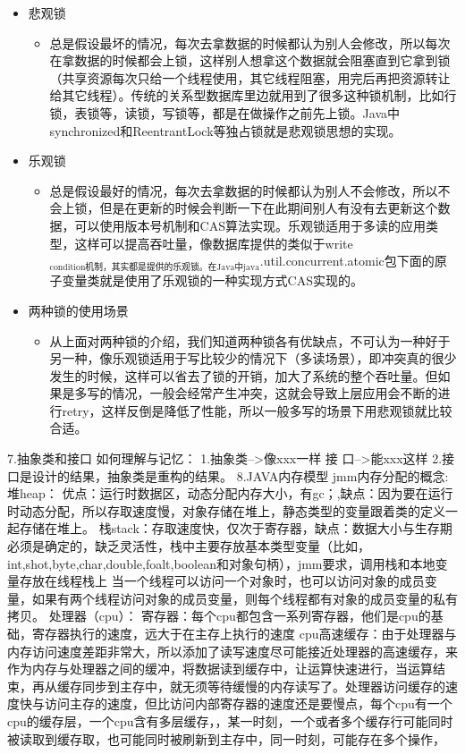 \documentclass[9pt, b5paper]{article}
\begin{document}
\begin{itemize}
\item 悲观锁
\begin{itemize}
\item 总是假设最坏的情况，每次去拿数据的时候都认为别人会修改，所以每次在拿数据的时候都会上锁，这样别人想拿这个数据就会阻塞直到它拿到锁（共享资源每次只给一个线程使用，其它线程阻塞，用完后再把资源转让给其它线程）。传统的关系型数据库里边就用到了很多这种锁机制，比如行锁，表锁等，读锁，写锁等，都是在做操作之前先上锁。Java中synchronized和ReentrantLock等独占锁就是悲观锁思想的实现。
\end{itemize}
\item 乐观锁
\begin{itemize}
\item 总是假设最好的情况，每次去拿数据的时候都认为别人不会修改，所以不会上锁，但是在更新的时候会判断一下在此期间别人有没有去更新这个数据，可以使用版本号机制和CAS算法实现。乐观锁适用于多读的应用类型，这样可以提高吞吐量，像数据库提供的类似于write$_{\text{condition机制，其实都是提供的乐观锁。在Java中java}}$.util.concurrent.atomic包下面的原子变量类就是使用了乐观锁的一种实现方式CAS实现的。
\end{itemize}
\item 两种锁的使用场景
\begin{itemize}
\item 从上面对两种锁的介绍，我们知道两种锁各有优缺点，不可认为一种好于另一种，像乐观锁适用于写比较少的情况下（多读场景），即冲突真的很少发生的时候，这样可以省去了锁的开销，加大了系统的整个吞吐量。但如果是多写的情况，一般会经常产生冲突，这就会导致上层应用会不断的进行retry，这样反倒是降低了性能，所以一般多写的场景下用悲观锁就比较合适。
\end{itemize}
\end{itemize}
7.抽象类和接口
如何理解与记忆：
1.抽象类-->像xxx一样
接 口-->能xxx这样
2.接口是设计的结果，抽象类是重构的结果。
8.JAVA内存模型
jmm内存分配的概念:
堆heap： 优点：运行时数据区，动态分配内存大小，有gc；,缺点：因为要在运行时动态分配，所以存取速度慢，对象存储在堆上，静态类型的变量跟着类的定义一起存储在堆上。
栈stack：存取速度快，仅次于寄存器，缺点：数据大小与生存期必须是确定的，缺乏灵活性，栈中主要存放基本类型变量（比如，int,shot,byte,char,double,foalt,boolean和对象句柄），jmm要求，调用栈和本地变量存放在线程栈上
当一个线程可以访问一个对象时，也可以访问对象的成员变量，如果有两个线程访问对象的成员变量，则每个线程都有对象的成员变量的私有拷贝。
处理器（cpu）： 寄存器：每个cpu都包含一系列寄存器，他们是cpu的基础，寄存器执行的速度，远大于在主存上执行的速度
cpu高速缓存：由于处理器与内存访问速度差距非常大，所以添加了读写速度尽可能接近处理器的高速缓存，来作为内存与处理器之间的缓冲，将数据读到缓存中，让运算快速进行，当运算结束，再从缓存同步到主存中，就无须等待缓慢的内存读写了。处理器访问缓存的速度快与访问主存的速度，但比访问内部寄存器的速度还是要慢点，每个cpu有一个cpu的缓存层，一个cpu含有多层缓存，，某一时刻，一个或者多个缓存行可能同时被读取到缓存取，也可能同时被刷新到主存中，同一时刻，可能存在多个操作，
\end{document}
